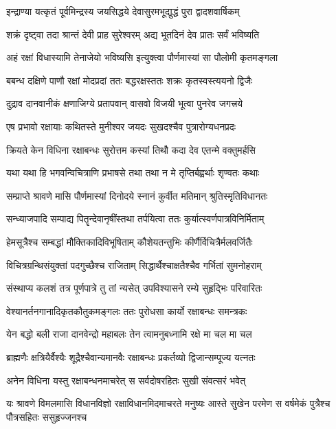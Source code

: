 \twolineshloka
{इन्द्राण्या यत्कृतं पूर्वमिन्द्रस्य जयसिद्धये}
{देवासुरमभूद्युद्धं पुरा द्वादशवार्षिकम्} %

\twolineshloka
{शक्रं दृष्ट्वा तदा श्रान्तं देवी प्राह सुरेश्वरम्}
{अद्य भूतदिनं देव प्रातः सर्वं भविष्यति} %

\twolineshloka
{अहं रक्षां विधास्यामि तेनाजेयो भविष्यसि}
{इत्युक्त्वा पौर्णमास्यां सा पौलोमी कृतमङ्गला} %

\twolineshloka
{बबन्ध दक्षिणे पाणौ रक्षां मोदप्रदां ततः}
{बद्धरक्षस्ततः शक्रः कृतस्वस्त्ययनो द्विजैः} %

\twolineshloka
{दुद्राव दानवानीकं क्षणाजिग्ये प्रतापवान्}
{वासवो विजयी भूत्वा पुनरेव जगत्त्रये} %

\twolineshloka
{एष प्रभावो रक्षायाः कथितस्ते मुनीश्वर}
{जयदः सुखदश्चैव पुत्रारोग्यधनप्रदः} %


\twolineshloka
{क्रियते केन विधिना रक्षाबन्धः सुरोत्तम}
{कस्यां तिथौ कदा देव एतन्मे वक्तुमर्हसि} %

\twolineshloka
{यथा यथा हि भगवन्विचित्राणि प्रभाषसे}
{तथा तथा न मे तृप्तिर्बह्वर्थाः शृण्वतः कथाः} %


\twolineshloka
{सम्प्राप्ते श्रावणे मासि पौर्णमास्यां दिनोदये}
{स्नानं कुर्वीत मतिमान् श्रुतिस्मृतिविधानतः} %

\twolineshloka
{सन्ध्याजपादि सम्पाद्य पितॄन्देवानृषींस्तथा}
{तर्पयित्वा ततः कुर्यात्स्वर्णपात्रविनिर्मिताम्} %

\twolineshloka
{हेमसूत्रैश्च सम्बद्धां मौक्तिकादिविभूषिताम्}
{कौशेयतन्तुभिः कीर्णैर्विचित्रैर्मलवर्जितैः} %

\twolineshloka
{विचित्रग्रन्थिसंयुक्तां पदगुच्छैश्च राजिताम्}
{सिद्धार्थैश्चाक्षतैश्चैव गर्भितां सुमनोहराम्} %

\twolineshloka
{संस्थाप्य कलशं तत्र पूर्णपात्रे तु तां न्यसेत्}
{उपविश्यासने रम्ये सुहृद्भिः परिवारितः} %

\twolineshloka
{वेश्यानर्तनगानादिकृतकौतुकमङ्गलः}
{ततः पुरोधसा कार्यो रक्षाबन्धः समन्त्रकः} %

\twolineshloka
{येन बद्धो बली राजा दानवेन्द्रो महाबलः}
{तेन त्वामनुबध्नामि रक्षे मा चल मा चल} %

\twolineshloka
{ब्राह्मणैः क्षत्रियैर्वैश्यैः शूद्रैश्चैवान्यमानवैः}
{रक्षाबन्धः प्रकर्तव्यो द्विजान्सम्पूज्य यत्नतः} %

\twolineshloka
{अनेन विधिना यस्तु रक्षाबन्धनमाचरेत्}
{स सर्वदोषरहितः सुखी संवत्सरं भवेत्} %

\twolineshloka
{यः श्रावणे विमलमासि विधानविज्ञो रक्षाविधानमिदमाचरते मनुष्यः}
{आस्ते सुखेन परमेण स वर्षमेकं पुत्रैश्च पौत्रसहितः ससुहृज्जनश्च} %

